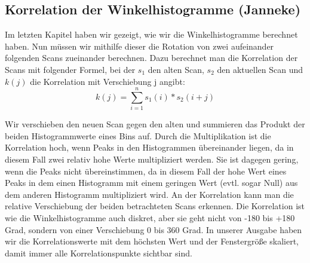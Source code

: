 \subsection{Korrelation der Winkelhistogramme (Janneke)}

Im letzten Kapitel haben wir gezeigt, wie wir die Winkelhistogramme berechnet haben. Nun müssen wir mithilfe dieser die Rotation von zwei aufeinander folgenden Scans zueinander berechnen. Dazu berechnet man die Korrelation der Scans mit folgender Formel, bei der $s_1$ den alten Scan, $s_2$ den aktuellen Scan und $k(j)$ die Korrelation mit Verschiebung j angibt:
$$k(j) = \sum_{i = 1}^{n} s_1(i)*s_2(i+j)$$

Wir verschieben den neuen Scan gegen den alten und summieren das Produkt der beiden Histogrammwerte eines Bins auf. Durch die Multiplikation ist die Korrelation hoch, wenn Peaks in den Histogrammen übereinander liegen, da in diesem Fall zwei relativ hohe Werte multipliziert werden. Sie ist dagegen gering, wenn die Peaks nicht übereinstimmen, da in diesem Fall der hohe Wert eines Peaks in dem einen Histogramm mit einem geringen Wert (evtl. sogar Null) aus dem anderen Histogramm multipliziert wird. An der Korrelation kann man die relative Verschiebung der beiden betrachteten Scans erkennen. Die Korrelation ist wie die Winkelhistogramme auch diskret, aber sie geht nicht von -180 bis +180 Grad, sondern von einer Verschiebung 0 bis 360 Grad. In unserer Ausgabe haben wir die Korrelationswerte mit dem höchsten Wert und der Fenstergröße skaliert, damit immer alle Korrelationspunkte sichtbar sind.
